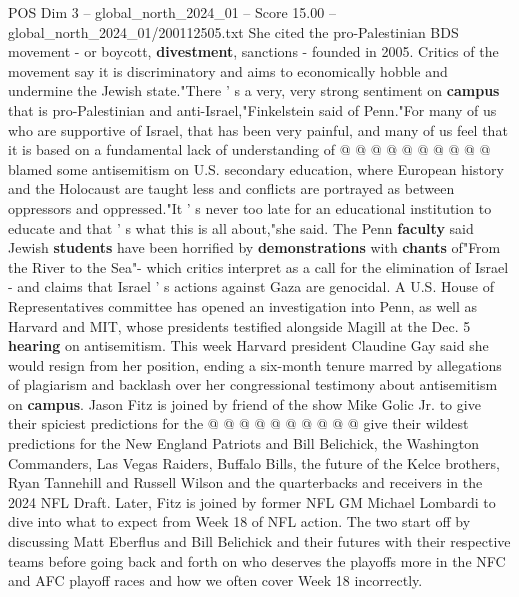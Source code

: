 \begin{textsample}{POS Dim 3 – global\_north\_2024\_01 – Score 15.00 – global\_north\_2024\_01/200112505.txt}
She cited the pro-Palestinian BDS movement - or boycott, \textbf{divestment}, sanctions - founded in 2005.
Critics of the movement say it is discriminatory and aims to economically hobble and undermine the Jewish state."There ' s a very, very strong sentiment on \textbf{campus} that is pro-Palestinian and anti-Israel,"Finkelstein said of Penn."For many of us who are supportive of Israel, that has been very painful, and many of us feel that it is based on a fundamental lack of understanding of @ @ @ @ @ @ @ @ @ @ blamed some antisemitism on U.S. secondary education, where European history and the Holocaust are taught less and conflicts are portrayed as between oppressors and oppressed."It ' s never too late for an educational institution to educate and that ' s what this is all about,"she said.
The Penn \textbf{faculty} said Jewish \textbf{students} have been horrified by \textbf{demonstrations} with \textbf{chants} of"From the River to the Sea"- which critics interpret as a call for the elimination of Israel - and claims that Israel ' s actions against Gaza are genocidal.
A U.S.
House of Representatives committee has opened an investigation into Penn, as well as Harvard and MIT, whose presidents testified alongside Magill at the Dec. 5 \textbf{hearing} on antisemitism.
This week Harvard president Claudine Gay said she would resign from her position, ending a six-month tenure marred by allegations of plagiarism and backlash over her congressional testimony about antisemitism on \textbf{campus}.
Jason Fitz is joined by friend of the show Mike Golic Jr. to give their spiciest predictions for the @ @ @ @ @ @ @ @ @ @ give their wildest predictions for the New England Patriots and Bill Belichick, the Washington Commanders, Las Vegas Raiders, Buffalo Bills, the future of the Kelce brothers, Ryan Tannehill and Russell Wilson and the quarterbacks and receivers in the 2024 NFL Draft.
Later, Fitz is joined by former NFL GM Michael Lombardi to dive into what to expect from Week 18 of NFL action.
The two start off by discussing Matt Eberflus and Bill Belichick and their futures with their respective teams before going back and forth on who deserves the playoffs more in the NFC and AFC playoff races and how we often cover Week 18 incorrectly.

\end{textsample}

